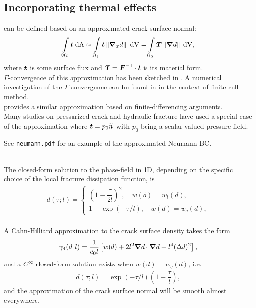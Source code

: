 \subsection{Incorporating thermal effects}

\subsectioncover

\begin{frame}{}
 can be defined based on an approximated crack surface normal:
\begin{align}
    \int\limits_{\partial \Omega} \boldsymbol{t} \text{ dA} \approx \int\limits_{\Omega_t} \boldsymbol{t} \left\lVert\boldsymbol{\nabla}_{\boldsymbol{x}} d\right\rVert \text{ dV} = \int\limits_{\Omega_0} \boldsymbol{T} \left\lVert\boldsymbol{\nabla} d\right\rVert \text{ dV},
\end{align}
where $\boldsymbol{t}$ is some surface flux and $\boldsymbol{T} = \boldsymbol{F}^{-1} \cdot \boldsymbol{t}$ is its material form. \\
\bigskip
$\Gamma$-convergence of this approximation has been sketched in \cite{chukwudozie2019variational}. A numerical investigation of the $\Gamma$-convergence can be found in \cite{nguyen2017phase} in the context of finite cell method. \\
\bigskip
\cite{miehe2015phase} provides a similar approximation based on finite-differencing arguments. \\
\bigskip
Many studies on pressurized crack and hydraulic fracture have used a special case of the approximation where $\boldsymbol{t} = p_0\widetilde{\boldsymbol{n}}$ with $p_0$ being a scalar-valued pressure field. \\
\bigskip
\begin{exampleblock}{}
    See \texttt{neumann.pdf} for an example of the approximated Neumann BC.
\end{exampleblock}
\end{frame}

\begin{frame}{}
 \\
The closed-form solution to the phase-field in 1D, depending on the specific choice of the local fracture dissipation function, is
\begin{align}
    d(\tau; l) =
    \begin{cases}
        \left( 1 - \dfrac{\tau}{2l} \right)^2, \quad w(d) = w_l(d), \\
        1-\exp(-\tau/l), \quad w(d) = w_q(d),
    \end{cases}
\end{align} \\
\bigskip
A Cahn-Hilliard approximation to the crack surface density takes the form
\begin{align}
    \gamma_4(d; l) = \dfrac{1}{c_0 l} \left[ w(d) + 2 l^2 \boldsymbol{\nabla} d \cdot \boldsymbol{\nabla} d + l^4 (\Delta d)^2 \right],
\end{align}
and a $C^\infty$ closed-form solution exists when $w(d) = w_q(d)$, i.e.
\begin{align}
    d(\tau; l) = \exp(-\tau/l) \left( 1 + \dfrac{\tau}{l} \right),
\end{align}
and the approximation of the crack surface normal will be smooth almost everywhere.
\end{frame}

